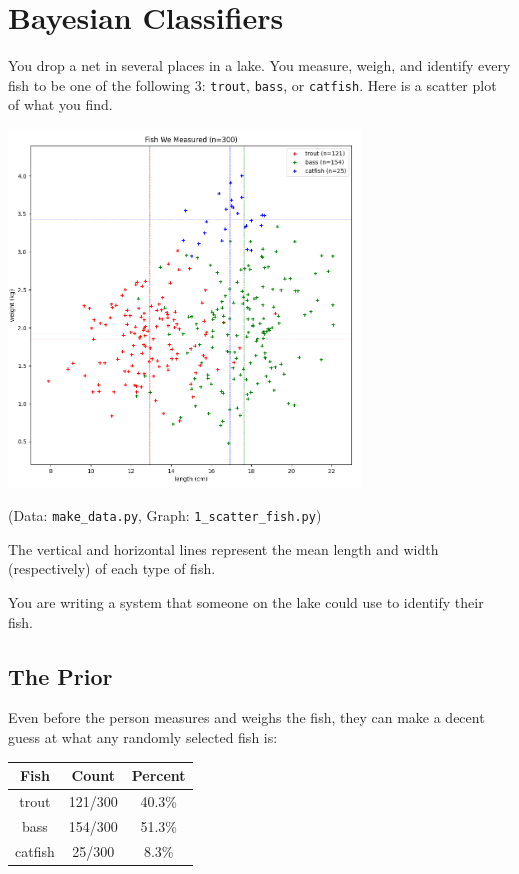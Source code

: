 \chapter{Bayesian Classifiers}
  
You drop a net in several places in a lake.   You measure, weigh, and identify every fish to be one of the following 3: \texttt{trout}, \texttt{bass}, or \texttt{catfish}.  Here is a scatter plot of what you find.

\includegraphics[width=0.7\textwidth]{1_scatter.png}

(Data: \texttt{make\_data.py}, Graph: \texttt{1\_scatter\_fish.py})

The vertical and horizontal lines represent the mean length and width (respectively) of each type of fish.

You are writing a system that someone on the lake could use to identify their fish.

\section{The Prior}

Even before the person measures and weighs the fish,  they can make a decent guess at what any randomly selected fish is:

\begin{tabular}{c | c | c}
Fish & Count & Percent \\
\hline
trout & 121/300 & 40.3\% \\
bass & 154/300 & 51.3\% \\
catfish & 25/300 & 8.3\%
\end{tabular}

